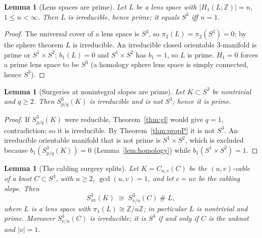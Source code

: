 \documentclass[11pt]{article}
\newtheorem{lemma}[theorem]{Lemma}
\theoremstyle{definition}
\theoremstyle{remark}
\newcommand{\Z}{\mathbb{Z}}
\begin{document}
\begin{lemma}[Lens spaces are prime]\label{lem:lensprime}
Let $L$ be a lens space with $|H_1(L;\Z)|=n$, $1\le n<\infty$.  Then $L$ is
irreducible, hence prime; it equals $S^3$ iff $n=1$.
\end{lemma}

\begin{proof}
The universal cover of a lens space is $S^3$, so $\pi_2(L)=\pi_2(S^3)=0$; by
the sphere theorem $L$ is irreducible.  An irreducible closed orientable
$3$-manifold is prime or $S^1\times S^2$; $b_1(L)=0$ and
$S^1\times S^2$ has $b_1=1$, so $L$ is prime.  $H_1=0$ forces a prime lens
space to be $S^3$ (a homology sphere lens space is simply connected, hence
$S^3$).
\end{proof}

\begin{lemma}[Surgeries at nonintegral slopes are prime]\label{lem:nonintegral}
Let $K\subset S^3$ be nontrivial and $q\ge 2$.  Then $S^3_{p/q}(K)$ is
irreducible and is not $S^3$; hence it is prime.
\end{lemma}

\begin{proof}
If $S^3_{p/q}(K)$ were reducible, Theorem~\ref{thm:gl} would give $q=1$,
contradiction; so it is irreducible.  By Theorem~\ref{thm:propP} it is not
$S^3$.  An irreducible orientable manifold that is not prime is
$S^1\times S^2$, which is excluded because $b_1(S^3_{p/q}(K))=0$
(Lemma~\ref{lem:homology}) while $b_1(S^1\times S^2)=1$.
\end{proof}

\begin{lemma}[The cabling surgery splits]\label{lem:cablesplit}
Let $K=C_{u,v}(C)$ be the $(u,v)$-cable of a knot $C\subset S^3$, with
$u\ge 2$, $\gcd(u,v)=1$, and let $c=uv$ be the cabling slope.  Then
\[
S^{3}_{uv}(K)\;\cong\;S^{3}_{v/u}(C)\;\#\;L,
\]
where $L$ is a lens space with $\pi_1(L)\cong \Z/u\Z$; in particular $L$ is
nontrivial and prime.  Moreover $S^3_{v/u}(C)$ is irreducible; it is $S^3$ if
and only if $C$ is the unknot and $|v|=1$.
\end{lemma}
\end{document}
